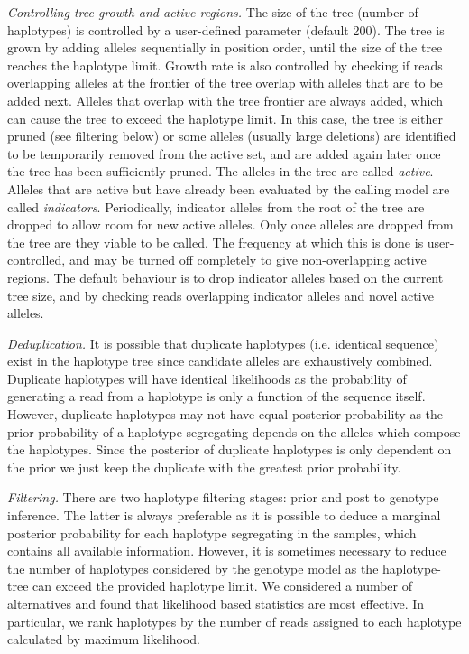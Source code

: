 \documentclass[notitlepage, twocolumn, 10pt]{article}
\begin{document}
\vspace{3mm}
\noindent\emph{Controlling tree growth and active regions.} The size of the tree (number of haplotypes) is controlled by a user-defined parameter (default 200). The tree is grown by adding alleles sequentially in position order, until the size of the tree reaches the haplotype limit. Growth rate is also controlled by checking if reads overlapping alleles at the frontier of the tree overlap with alleles that are to be added next. Alleles that overlap with the tree frontier are always added, which can cause the tree to exceed the haplotype limit. In this case, the tree is either pruned (see filtering below) or some alleles (usually large deletions) are identified to be temporarily removed from the active set, and are added again later once the tree has been sufficiently pruned. The alleles in the tree are called \emph{active}. Alleles that are active but have already been evaluated by the calling model are called \emph{indicators}. Periodically, indicator alleles from the root of the tree are dropped to allow room for new active alleles. Only once alleles are dropped from the tree are they viable to be called. The frequency at which this is done is user-controlled, and may be turned off completely to give non-overlapping active regions. The default behaviour is to drop indicator alleles based on the current tree size, and by checking reads overlapping indicator alleles and novel active alleles.

\vspace{3mm}
\noindent\emph{Deduplication.} It is possible that duplicate haplotypes (i.e. identical sequence) exist in the haplotype tree since candidate alleles are exhaustively combined. Duplicate haplotypes will have identical likelihoods as the probability of generating a read from a haplotype is only a function of the sequence itself. However, duplicate haplotypes may not have equal posterior probability as the prior probability of a haplotype segregating depends on the alleles which compose the haplotypes. Since the posterior of duplicate haplotypes is only dependent on the prior we just keep the duplicate with the greatest prior probability.

\vspace{3mm}
\noindent\emph{Filtering.} There are two haplotype filtering stages: prior and post to genotype inference. The latter is always preferable as it is possible to deduce a marginal posterior probability for each haplotype segregating in the samples, which contains all available information. However, it is sometimes necessary to reduce the number of haplotypes considered by the genotype model as the haplotype-tree can exceed the provided haplotype limit. We considered a number of alternatives and found that likelihood based statistics are most effective. In particular, we rank haplotypes by the number of reads assigned to each haplotype calculated by maximum likelihood.
\end{document}
